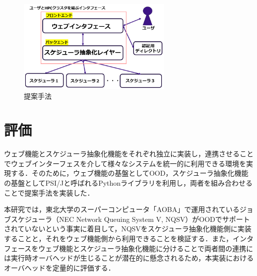 \documentclass[a4paper,oneside,twocolumn,notitlepage,dvipdfmx]{jsarticle}
\begin{document}
\begin{figure}[h]
  \centering
  \includegraphics[width=75mm]{./fig/proposed_method.png}
  \caption{提案手法}
  \label{fig1}
\end{figure}

\section{評価}
ウェブ機能とスケジューラ抽象化機能をそれぞれ独立に実装し，連携させることでウェブインターフェスを介して様々なシステムを統一的に利用できる環境を実現する．そのために，ウェブ機能の基盤としてOOD，スケジューラ抽象化機能の基盤としてPSI/J\cite{citation_6}と呼ばれるPythonライブラリを利用し，両者を組み合わせることで提案手法を実装した．\par
本研究では，東北大学のスーパーコンピュータ「AOBA」で運用されているジョブスケジューラ（NEC Network Queuing System V, NQSV）がOODでサポートされていないという事実に着目して，NQSVをスケジューラ抽象化機能側に実装することと，それをウェブ機能側から利用できることを検証する．また，インタフェースをウェブ機能とスケジューラ抽象化機能に分けることで両者間の連携には実行時オーバヘッドが生じることが潜在的に懸念されるため，本実装におけるオーバヘッドを定量的に評価する．\par
\end{document}
